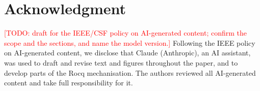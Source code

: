 \documentclass[conference]{IEEEtran}
\newcommand{\todo}[1]{\textcolor{red}{[TODO: #1]}}
\theoremstyle{definition}
\begin{document}
\section*{Acknowledgment}
\todo{draft for the IEEE/CSF policy on AI-generated content; confirm the scope and the sections, and name the model version.}
Following the IEEE policy on AI-generated content, we disclose that Claude
(Anthropic), an AI assistant, was used to draft and revise text and figures
throughout the paper, and to develop parts of the Rocq mechanisation. The authors
reviewed all AI-generated content and take full responsibility for it.




\label{sec:appendix}

\end{document}
